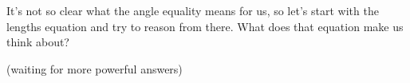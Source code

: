 
It's not so clear what the angle equality means for us, so let's start with the lengths equation and try to reason from there. What does that equation make us think about?

(waiting for more powerful answers)





















